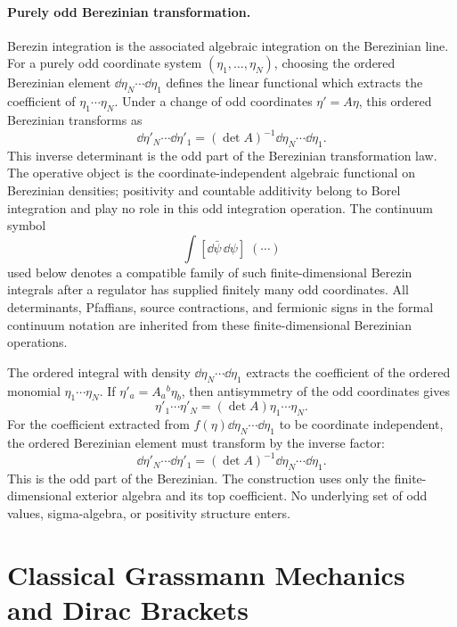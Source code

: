 \paragraph{Purely odd Berezinian transformation.}
Berezin integration is the associated algebraic integration on the
Berezinian line. For a purely odd coordinate system
\((\eta_1,\ldots,\eta_N)\), choosing the ordered Berezinian element
\(\dd\eta_N\cdots\dd\eta_1\) defines the linear functional which extracts the
coefficient of \(\eta_1\cdots\eta_N\). Under a change of odd coordinates
\(\eta'=A\eta\), this ordered Berezinian transforms as
\[
  \dd\eta'_N\cdots\dd\eta'_1
  =
  (\det A)^{-1}\dd\eta_N\cdots\dd\eta_1 .
\]
This inverse determinant is the odd part of the Berezinian transformation
law. The operative object is the coordinate-independent algebraic functional
on Berezinian densities; positivity and countable additivity belong to Borel
integration and play no role in this odd integration operation. The continuum
symbol
\[
  \int[\dd\bar\psi\,\dd\psi]\;(\cdots)
\]
used below denotes a compatible family of such finite-dimensional Berezin
integrals after a regulator has supplied finitely many odd coordinates. All
determinants, Pfaffians, source contractions, and fermionic signs in the
formal continuum notation are inherited from these finite-dimensional
Berezinian operations.

The ordered integral with density
\(\dd\eta_N\cdots\dd\eta_1\) extracts the coefficient of the ordered monomial
\(\eta_1\cdots\eta_N\). If \(\eta'_a=A_a{}^b\eta_b\), then antisymmetry of
the odd coordinates gives
\[
  \eta'_1\cdots\eta'_N=(\det A)\eta_1\cdots\eta_N .
\]
For the coefficient extracted from \(f(\eta)\dd\eta_N\cdots\dd\eta_1\) to be
coordinate independent, the ordered Berezinian element must transform by the
inverse factor:
\[
  \dd\eta'_N\cdots\dd\eta'_1
  =
  (\det A)^{-1}\dd\eta_N\cdots\dd\eta_1 .
\]
This is the odd part of the Berezinian.  The construction uses only the
finite-dimensional exterior algebra and its top coefficient.  No underlying
set of odd values, sigma-algebra, or positivity structure enters.

\section{Classical Grassmann Mechanics and Dirac Brackets}

